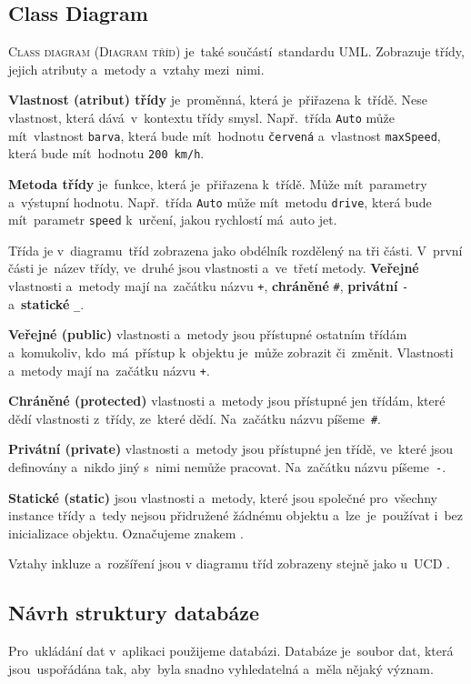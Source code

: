 \documentclass[14pt,a4paper]{article}
\begin{document}
        \subsection{Class Diagram}
        \textsc{Class diagram} (\textsc{Diagram tříd}) je~také součástí~standardu \textsc{UML}. Zobrazuje třídy, jejich atributy a~metody a~vztahy mezi~nimi.

        \textbf{Vlastnost (atribut) třídy} je~proměnná, která je~přiřazena k~třídě. Nese vlastnost, která dává~v~kontextu třídy smysl. Např.~třída \texttt{Auto} může mít~vlastnost \texttt{barva}, která bude mít~hodnotu \texttt{červená} a~vlastnost \texttt{maxSpeed}, která bude mít~hodnotu \texttt{200 km/h}.

        \textbf{Metoda třídy} je~funkce, která je~přiřazena k~třídě. Může mít~parametry a~výstupní hodnotu. Např.~třída \texttt{Auto} může mít~metodu \texttt{drive}, která bude mít~parametr \texttt{speed} k~určení, jakou rychlostí má~auto jet.
        
        Třída je v~diagramu~tříd zobrazena jako obdélník rozdělený na tři části. V~první části je~název třídy, ve~druhé jsou vlastnosti a~ve~třetí metody. \textbf{Veřejné} vlastnosti a~metody mají na~začátku názvu \texttt{+}, \textbf{chráněné} \texttt{\#}, \textbf{privátní} \texttt{-} a~\textbf{statické} \texttt{\_}.
        
        \textbf{Veřejné (public)} vlastnosti a~metody jsou přístupné ostatním třídám a~komukoliv, kdo~má~přístup k~objektu je~může zobrazit či~změnit. Vlastnosti a~metody mají na~začátku názvu \texttt{+}.

        \textbf{Chráněné (protected)} vlastnosti a~metody jsou přístupné jen třídám, které dědí vlastnosti z~třídy, ze~které dědí. Na~začátku názvu píšeme~\texttt{\#}.
        
        \textbf{Privátní (private)} vlastnosti a~metody jsou přístupné jen třídě, ve~které jsou definovány a~nikdo jiný s~nimi nemůže pracovat. Na~začátku názvu píšeme~\texttt{-}.
        
        \textbf{Statické (static)} jsou vlastnosti a~metody, které jsou společné pro~všechny instance třídy a~tedy nejsou přidružené žádnému objektu a~lze~je~používat i~bez inicializace objektu. Označujeme znakem \texttt{\textunderscore}.
        
        Vztahy inkluze a~rozšíření jsou v diagramu tříd zobrazeny stejně jako u~\textsc{UCD} \parencite{visualparadigmClassDiagram}.

        \subsection{Návrh struktury databáze}
        Pro~ukládání dat v~aplikaci použijeme databázi. Databáze je~soubor dat, která jsou~uspořádána tak, aby~byla snadno vyhledatelná a~měla nějaký význam.
\end{document}
